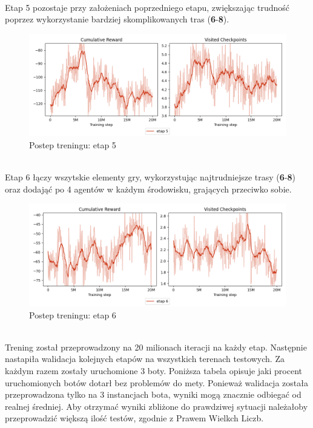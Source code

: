\phantom{.}\\
Etap 5 pozostaje przy założeniach poprzedniego etapu, zwiększając trudność poprzez wykorzystanie bardziej skomplikowanych tras (\textbf{6}-\textbf{8}).
\begin{figure}[H]
    \centering
    \includegraphics[width=\textwidth]{graphs/training_progress_5.png}
    \caption{Postep treningu: etap 5}
    \label{fig}
\end{figure}
\phantom{.}\\
Etap 6 łączy wszytskie elementy gry, wykorzystując najtrudniejsze trasy (\textbf{6}-\textbf{8}) oraz dodająć po 4 agentów w każdym środowisku, grających przeciwko sobie.
\begin{figure}[H]
    \centering
    \includegraphics[width=\textwidth]{graphs/training_progress_6.png}
    \caption{Postep treningu: etap 6}
    \label{fig}
\end{figure}
\phantom{.}\\
\clearpage
Trening został przeprowadzony na 20 milionach iteracji na każdy etap. Następnie nastapiła walidacja kolejnych etapów na wszystkich terenach testowych. Za każdym razem zostały uruchomione 3 boty. Poniższa tabela opisuje jaki procent uruchomionych botów dotarł bez problemów do mety. Ponieważ walidacja została przeprowadzona tylko na 3 instancjach bota, wyniki mogą znacznie odbiegać od realnej średniej. Aby otrzymać wyniki zbliżone do prawdziwej sytuacji należałoby przeprowadzić większą ilość testów, zgodnie z Prawem Wielkch Liczb.
